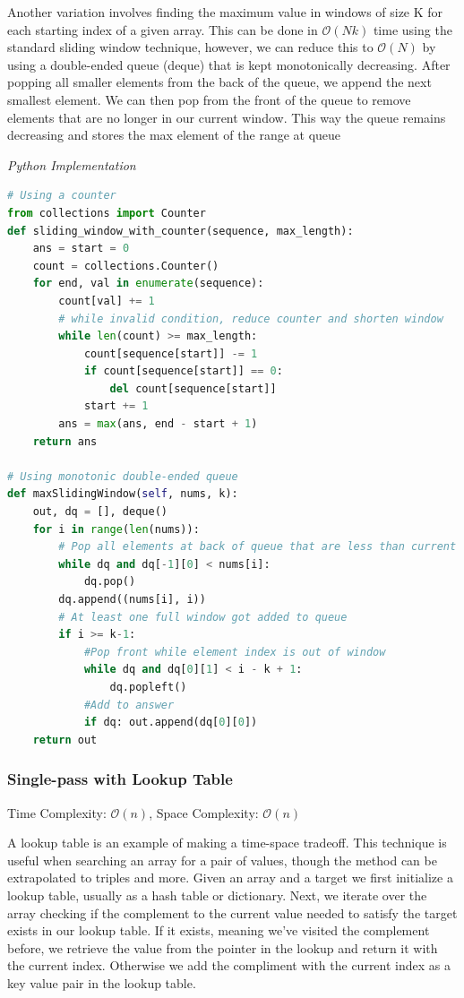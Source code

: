 \documentclass{article}
\newcommand{\bigO}{\mathcal{O}}
\begin{document}
    Another variation involves finding the maximum value in windows of size K for each starting index of a given array. This can be done in $\bigO(Nk)$ time using the standard sliding window technique, however, we can reduce this to $\bigO(N)$ by using a double-ended queue (deque) that is kept monotonically decreasing. After popping all smaller elements from the back of the queue, we append the next smallest element. We can then pop from the front of the queue to remove elements that are no longer in our current window. This way the queue remains decreasing and stores the max element of the range at queue

\vspace{8pt} \emph{Python Implementation}
\begin{lstlisting}[language=Python]
# Using a counter
from collections import Counter
def sliding_window_with_counter(sequence, max_length):
    ans = start = 0
    count = collections.Counter()
    for end, val in enumerate(sequence):
        count[val] += 1
        # while invalid condition, reduce counter and shorten window 
        while len(count) >= max_length:
            count[sequence[start]] -= 1
            if count[sequence[start]] == 0:
                del count[sequence[start]]
            start += 1
        ans = max(ans, end - start + 1)
    return ans
    
# Using monotonic double-ended queue
def maxSlidingWindow(self, nums, k):
    out, dq = [], deque()
    for i in range(len(nums)):
        # Pop all elements at back of queue that are less than current element
        while dq and dq[-1][0] < nums[i]:
            dq.pop()
        dq.append((nums[i], i))
        # At least one full window got added to queue
        if i >= k-1:
            #Pop front while element index is out of window
            while dq and dq[0][1] < i - k + 1:
                dq.popleft()
            #Add to answer
            if dq: out.append(dq[0][0])
    return out
\end{lstlisting}

    \subsubsection{Single-pass with Lookup Table}
    Time Complexity: $\bigO(n)$, Space Complexity: $\bigO(n)$
    
    A lookup table is an example of making a time-space tradeoff. This technique is useful when searching an array for a pair of values, though the method can be extrapolated to triples and more. Given an array and a target we first initialize a lookup table, usually as a hash table or dictionary. Next, we iterate over the array checking if the complement to the current value needed to satisfy the target exists in our lookup table. If it exists, meaning we've visited the complement before, we retrieve the value from the pointer in the lookup and return it with the current index. Otherwise we add the compliment with the current index as a key value pair in the lookup table.
\end{document}
